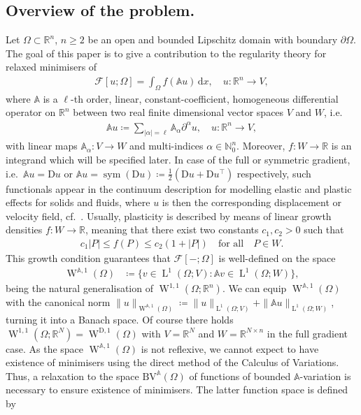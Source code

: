 \documentclass[a4paper,10pt,reqno,oneside]{amsart}
\numberwithin{equation}{section}
\newcommand{\R}{\mathbb R}
\newcommand{\N}{\mathbb N}
\newcommand{\A}{\mathscr{A}}
\newcommand{\Aop}{\mathbb{A}}
\newcommand{\lebe}{\operatorname{L}}
\newcommand{\sobo}{\operatorname{W}}
\newcommand{\BV}{\mathrm{BV}}
\newcommand{\D}{\mathrm{D}}
\newcommand{\sym}{\operatorname{sym}}
\newcommand{\dx}[1]{\,\mathrm{d}#1}
\newcommand{\del}{\partial}
\newcommand{\abs}[1]{\left\lvert#1\right\rvert}
\newcommand{\F}{\mathscr{F}}
\renewcommand{\L}{\mathrm{L}}
\begin{document}
\subsection{Overview of the problem.} Let $\Omega \subset \R^n$, $n\geq 2$ be an open and bounded Lipschitz domain with boundary $\del\Omega$. The goal of this paper is to give a contribution to the regularity theory for relaxed minimisers of 
\begin{align*}
	\F[u;\Omega] = \int_\Omega f(\Aop u)\dx{x}, \quad u\colon \R^n \to V,
\end{align*}
 where $\Aop$ is a $\ell$-th order, linear, constant-coefficient, homogeneous differential operator on $\R^n$ between two real finite dimensional vector spaces $V$ and $W$, i.e.
\begin{align}\label{eq:DifferentialOperator}
\Aop u\coloneqq \sum_{\abs{\alpha}=\ell}\Aop_{\alpha}\partial^\alpha u, \quad u\colon\R^n\to V,
\end{align}
with linear maps $\Aop_{\alpha}:V\to W$ and multi-indices $\alpha\in \N_0^n$. Moreover,  $f\colon W\to\R$ is an integrand which will be specified later. In case of the full or symmetric gradient, i.e.~$\Aop u =\D u$ or $\Aop u=\sym(\D u)\coloneqq\frac{1}{2}(\D u+\D u^\top)$ respectively, such functionals appear in the continuum description for modelling elastic and plastic effects for solids and fluids, where $u$ is then the corresponding displacement or velocity field, cf.~\cite{FuchsSeregin}. Usually, plasticity is described by means of linear growth densities $f\colon W\to \R$,  meaning that there exist two constants $c_1,c_2>0$ such that
\begin{align}\label{eq:LinGrowth}
c_1\abs{P}\le f(P) \le c_2 (1+\abs{P})\quad\mbox{for all}\quad P\in W.
\end{align}
This growth condition guarantees that $\F[-;\Omega]$ is well-defined on the space 
\begin{align*}
	\sobo^{\Aop,1}(\Omega) &\coloneqq \{v\in \lebe^1(\Omega;V): \Aop v\in \lebe^1(\Omega;W)\},
\end{align*}
being the natural generalisation of $\sobo^{1,1}(\Omega;\R^n)$. We can equip $\sobo^{\Aop,1}(\Omega)$ with the canonical norm $\|u\|_{\sobo^{\Aop,1}(\Omega)}\coloneqq \|u\|_{\lebe^1(\Omega;V)} + \|\Aop u\|_{\lebe^1(\Omega;W)}$, turning it into a Banach space.  Of course there holds $\sobo^{1,1}(\Omega;\R^N)= \sobo^{\D,1}(\Omega)$ with $V=\R^N$ and $W=\R^{N\times n}$ in the full gradient case. As the space $\sobo^{\Aop,1}(\Omega)$ is not reflexive, we cannot expect to have existence of minimisers using the direct method of the Calculus of Variations. Thus, a relaxation to the space $\BV^\Aop(\Omega)$ of functions of bounded $\Aop$-variation is necessary to ensure existence of minimisers. The latter function space is defined by
\end{document}
